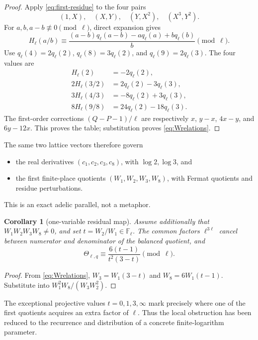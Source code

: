 \documentclass[11pt]{article}
\newtheorem{corollary}[theorem]{Corollary}
\theoremstyle{definition}
\theoremstyle{remark}
\newcommand{\FF}{\mathbb F}
\begin{document}
\begin{proof}
Apply \eqref{eq:first-residue} to the four pairs
\[
(1,X),\quad(X,Y),\quad(Y,X^2),\quad(X^3,Y^2).
\]
For \(a,b,a-b\not\equiv0\pmod\ell\), direct expansion gives
\begin{equation}\label{eq:H-rational}
H_\ell(a/b)
\equiv\frac{(a-b)q_\ell(a-b)-a q_\ell(a)+bq_\ell(b)}{b}
\pmod\ell.
\end{equation}
Use \(q_\ell(4)=2q_\ell(2)\),
\(q_\ell(8)=3q_\ell(2)\), and
\(q_\ell(9)=2q_\ell(3)\).  The four values are
\begin{align*}
H_\ell(2)&=-2q_\ell(2),\\
2H_\ell(3/2)&=2q_\ell(2)-3q_\ell(3),\\
3H_\ell(4/3)&=-8q_\ell(2)+3q_\ell(3),\\
8H_\ell(9/8)&=24q_\ell(2)-18q_\ell(3).
\end{align*}
The first-order corrections \((Q-P-1)/\ell\) are respectively
\(x\), \(y-x\), \(4x-y\), and \(6y-12x\).  This proves the table; substitution proves \eqref{eq:Wrelations}.
\end{proof}

The same two lattice vectors therefore govern
\begin{itemize}
\item the real derivatives \((c_1,c_2,c_3,c_8)\), with \(\log2,\log3\), and
\item the first finite-place quotients \((W_1,W_2,W_3,W_8)\), with Fermat quotients and residue perturbations.
\end{itemize}
This is an exact adelic parallel, not a metaphor.

\begin{corollary}[one-variable residual map]\label{cor:belyi}
Assume additionally that \(W_1W_2W_3W_8\ne0\), and set
\(t=W_2/W_1\in\FF_\ell\).  The common factors \(\ell^{3\ell}\) cancel between numerator and denominator of the balanced quotient, and
\begin{equation}\label{eq:belyi}
\Theta_{\ell,q}
\equiv\frac{6(t-1)}{t^2(3-t)}\pmod\ell.
\end{equation}
\end{corollary}

\begin{proof}
From \eqref{eq:Wrelations},
\(W_3=W_1(3-t)\) and \(W_8=6W_1(t-1)\).  Substitute into
\(W_1^2W_8/(W_3W_2^2)\).
\end{proof}

The exceptional projective values \(t=0,1,3,\infty\) mark precisely where one of the first quotients acquires an extra factor of \(\ell\).  Thus the local obstruction has been reduced to the recurrence and distribution of a concrete finite-logarithm parameter.
\end{document}
